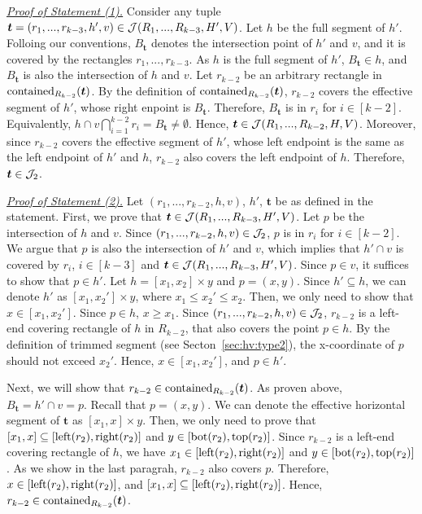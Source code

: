 \noindent \underline{\em Proof of Statement (1).} Consider any tuple $\textrm{\boldmath${t}$} = (r_1,...,r_{k-3}, h', v) \in \mathcal{J}(R_1,...,R_{k-3},H',V)$. Let $h$ be the full segment of $h'$. Folloing our conventions, $B_\bm{t}$ denotes the intersection point of $h'$ and $v$, and it is covered by the rectangles $r_1,...,r_{k-3}$. As $h$ is the full segment of $h'$, $B_\bm{t} \in h$, and $B_\bm{t}$ is also the intersection of $h$ and $v$. Let $r_{k-2}$ be an arbitrary rectangle in $\mathrm{contained}_{R_{k-2}}(\textrm{\boldmath${t}$})$. By the definition of $\mathrm{contained}_{R_{k-2}}(\textrm{\boldmath${t}$})$, $r_{k-2}$ covers the effective segment of $h'$, whose right enpoint is $B_{\bm{t}}$. Therefore, $B_{\bm{t}}$ is in $r_{i}$ for $i \in [k-2]$. Equivalently, $h \cap v \bigcap_{i = 1}^{k-2} r_i = B_\bm{t} \neq \emptyset$. Hence,
$\textrm{\boldmath${t}$} \in \mathcal{J}(R_1,...,R_{k-2},H,V)$. Moreover, since $r_{k-2}$ covers the effective segment of $h'$, whose left endpoint is the same as the left endpoint of $h'$ and $h$, $r_{k-2}$ also covers the left endpoint of $h$. Therefore, $\textrm{\boldmath${t}$} \in \mathcal{J}_2$. 

\vgap 

\noindent \underline{\em Proof of Statement (2).} Let $(r_1,...,r_{k-2},h,v)$, $h'$, $\bm{t}$ be as defined in the statement. First, we prove that $\textrm{\boldmath${t}$}\in \mathcal{J}(R_1,...,R_{k-3}, H', V)$.
Let $p$ be the intersection of $h$ and $v$. Since $(r_1,...,r_{k-2},h,v)\in \mathcal{J}_2$, $p$ is in $r_i$ for $i \in [k-2]$.
We argue that $p$ is also the intersection of $h'$ and $v$, which implies that $h'\cap v$ is covered by $r_i$, $i \in [k-3]$ and $\textrm{\boldmath${t}$} \in \mathcal{J}(R_1,...,R_{k-3},H',V)$. Since $p \in v$, it suffices to show that $p \in h'$. Let $h = [x_1,x_2]\times y$ and $p = (x,y)$. Since $h' \subseteq h$, we can denote $h'$ as $[x_1, x_2'] \times y$, where $x_1 \le x_2' \le x_2$. Then, we only need to show that $x \in [x_1, x_2']$. Since $p \in h$, $x \ge x_1$. Since $(r_1,...,r_{k-2},h,v) \in \mathcal{J}_2$, $r_{k-2}$ is a left-end covering rectangle of $h$ in $R_{k-2}$, that also covers the point $p \in h$. By the definition of trimmed segment (see Secton~\ref{sec:hv:type2}), the x-coordinate of $p$ should not exceed $x_2'$. Hence, $x \in [x_1, x_2']$, and $p \in h'$.

\vgap 

Next, we will show that $r_{k-2}\in \mathrm{contained}_{R_{k-2}}(\textrm{\boldmath${t}$})$. As proven above, $B_\bm{t} = h'\cap v = p$. Recall that $p = (x,y)$. We can denote the effective horizontal segment of $\bm{t}$ as $[x_1, x] \times y$. Then, we only need to prove that $[x_1,x] \subseteq [\mathrm{left}(r_2), \mathrm{right}(r_2)]$ and $y \in [\mathrm{bot}(r_2), \mathrm{top}(r_2)]$. Since $r_{k-2}$ is a left-end covering rectangle of $h$, we have  $x_1 \in [\mathrm{left}(r_2), \mathrm{right}(r_2)]$ and $y \in [\mathrm{bot}(r_2), \mathrm{top}(r_2)]$. As we show in the last paragrah, $r_{k-2}$ also covers $p$. Therefore, $x \in [\mathrm{left}(r_2), \mathrm{right}(r_2)]$, and $[x_1,x] \subseteq [\mathrm{left}(r_2), \mathrm{right}(r_2)]$. Hence, $r_{k-2}\in \mathrm{contained}_{R_{k-2}}(\textrm{\boldmath${t}$})$.

